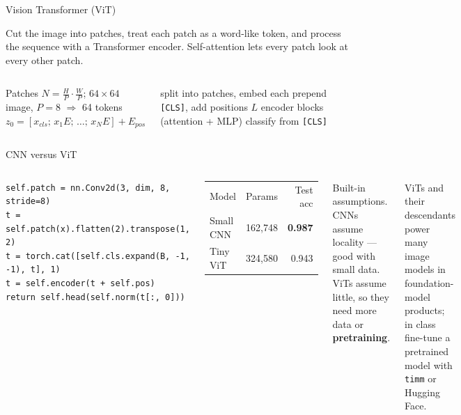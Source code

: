 \documentclass[aspectratio=169,11pt]{beamer}
\begin{document}

\begin{frame}{Vision Transformer (ViT)}
\begin{bdef}[ViT]
Cut the image into patches, treat each patch as a word-like token, and process the sequence with a Transformer encoder. Self-attention lets every patch look at every other patch.
\end{bdef}
\begin{columns}[T]
\begin{bmath}[Tokens]
Patches $N=\frac{H}{P}\cdot\frac{W}{P}$; \;$64\times64$ image, $P=8$ $\Rightarrow$ 64 tokens\\[2pt]
$z_0=[x_{cls};\,x_1E;\,\dots;\,x_NE]+E_{pos}$
\end{bmath}
\begin{balgo}
\begin{algorithmic}[1]
\State split into patches, embed each
\State prepend \texttt{[CLS]}, add positions
\State $L$ encoder blocks (attention + MLP)
\State classify from \texttt{[CLS]}
\end{algorithmic}
\end{balgo}
\end{columns}
\end{frame}

\begin{frame}[fragile]{CNN versus ViT}
\begin{columns}[T]
\begin{bcode}
\begin{lstlisting}
self.patch = nn.Conv2d(3, dim, 8, stride=8)
t = self.patch(x).flatten(2).transpose(1, 2)
t = torch.cat([self.cls.expand(B, -1, -1), t], 1)
t = self.encoder(t + self.pos)
return self.head(self.norm(t[:, 0]))
\end{lstlisting}
\end{bcode}
\begin{bres}
\begin{tabular}{lrr}
Model & Params & Test acc\\
Small CNN & 162,748 & \textbf{0.987}\\
Tiny ViT & 324,580 & 0.943\\
\end{tabular}
\end{bres}
\begin{bdef}
Built-in assumptions. CNNs assume locality --- good with small data. ViTs assume little, so they need more data or \textbf{pretraining}.
\end{bdef}
\begin{bapp}
ViTs and their descendants power many image models in foundation-model products; in class fine-tune a pretrained model with \texttt{timm} or Hugging Face.
\end{bapp}
\end{columns}
\end{frame}
\end{document}
